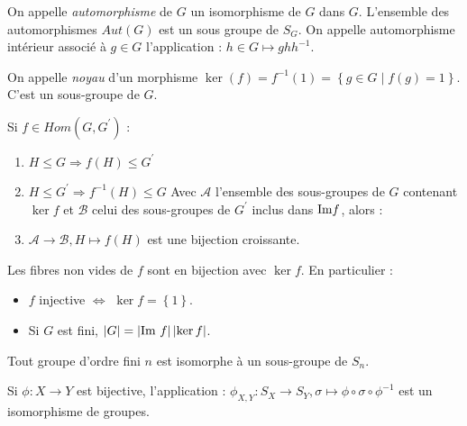 \documentclass{cours}
\begin{document}
\begin{definition}
    On appelle \emph{automorphisme} de $G$ un isomorphisme de $G$ dans $G$. L'ensemble des automorphismes $Aut(G)$ est un sous groupe de $S_{G}$. On appelle automorphisme intérieur associé à $g \in G$ l'application : $h \in G \mapsto ghh^{-1}$.
\end{definition}

\begin{definition}
    On appelle \emph{noyau} d'un morphisme $\ker(f) = f^{-1}(1) = \left\{g \in G \mid f(g) = 1\right\}$. C'est un sous-groupe de $G$.
\end{definition}

\begin{proposition}
    Si $f \in Hom(G, G^{'})$ :
    \begin{enumerate}
        \item $H \leq G \Rightarrow f(H) \leq G^{'}$
        \item $H \leq G^{'} \Rightarrow f^{-1}(H) \leq G$
              Avec $\mathcal{A}$ l'ensemble des sous-groupes de $G$ contenant $\ker f$ et $\mathcal{B}$ celui des sous-groupes de $G^{'}$ inclus dans $\textmd{Im} f$, alors :
        \item $\mathcal{A} \rightarrow\mathcal{B}, H \mapsto f(H)$ est une bijection croissante.
    \end{enumerate}
\end{proposition}

\begin{proposition}
    Les fibres non vides de $f$ sont en bijection avec $\ker f$. En particulier :
    \begin{itemize}
        \item $f$ injective $\Leftrightarrow$ $\ker f = \left\{1\right\}$.
        \item Si $G$ est fini, $\left|G\right| = \left|\text{Im } f\right|\left|\ker f\right|$.
    \end{itemize}
\end{proposition}

\begin{theorem}[Cayley]
    Tout groupe d'ordre fini $n$ est isomorphe à un sous-groupe de $S_{n}$.
\end{theorem}

\begin{lemma}
    Si $\phi : X \rightarrow Y$ est bijective, l'application : $\phi_{X, Y} : S_{X} \rightarrow S_{Y}, \sigma \mapsto \phi \circ \sigma \circ \phi^{-1}$ est un isomorphisme de groupes.
\end{lemma}
\end{document}
